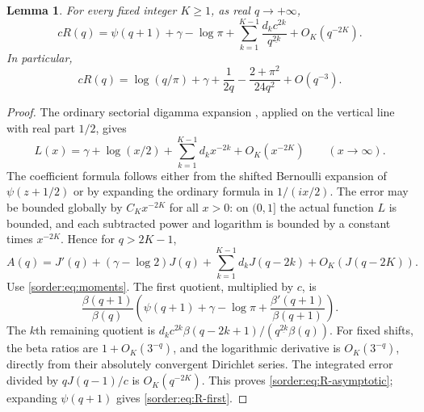 \documentclass[11pt,a4paper]{article}
\newtheorem{lemma}[theorem]{Lemma}
\theoremstyle{definition}
\theoremstyle{remark}
\numberwithin{equation}{section}
\begin{document}
\begin{lemma}\label{sorder:lem:R-asymptotic}
For every fixed integer $K\ge1$, as real $q\to+\infty$,
\begin{equation}\label{sorder:eq:R-asymptotic}
 cR(q)=\psi(q+1)+\gamma-\log\pi
       +\sum_{k=1}^{K-1}\frac{d_kc^{2k}}{q^{\underline{2k}}}
       +O_K(q^{-2K}).
\end{equation}
In particular,
\begin{equation}\label{sorder:eq:R-first}
 cR(q)=\log(q/\pi)+\gamma+\frac1{2q}
                  -\frac{2+\pi^2}{24q^2}+O(q^{-3}).
\end{equation}
\end{lemma}
\begin{proof}
The ordinary sectorial digamma expansion \cite[\S5.11]{DLMF}, applied on the vertical
line with real part $1/2$, gives
\[
 L(x)=\gamma+\log(x/2)+\sum_{k=1}^{K-1}d_kx^{-2k}
                     +O_K(x^{-2K})\qquad(x\to\infty).
\]
The coefficient formula follows either from the shifted Bernoulli
expansion of $\psi(z+1/2)$ or by expanding the ordinary formula in
$1/(ix/2)$. The error may be bounded globally by $C_Kx^{-2K}$ for
all $x>0$: on $(0,1]$ the actual function $L$ is bounded, and each
subtracted power and logarithm is bounded by a constant times
$x^{-2K}$. Hence for $q>2K-1$,
\[
 A(q)=J'(q)+(\gamma-\log2)J(q)
       +\sum_{k=1}^{K-1}d_kJ(q-2k)+O_K(J(q-2K)).
\]
Use \eqref{sorder:eq:moments}. The first quotient, multiplied by $c$,
is
\[
 \frac{\beta(q+1)}{\beta(q)}
 \left(\psi(q+1)+\gamma-\log\pi+
                         \frac{\beta'(q+1)}{\beta(q+1)}\right).
\]
The $k$th remaining quotient is
$d_kc^{2k}\beta(q-2k+1)/(q^{\underline{2k}}\beta(q))$.
For fixed shifts, the beta ratios are $1+O_K(3^{-q})$, and the
logarithmic derivative is $O_K(3^{-q})$, directly from their
absolutely convergent Dirichlet series. The integrated error divided
by $qJ(q-1)/c$ is $O_K(q^{-2K})$. This proves
\eqref{sorder:eq:R-asymptotic}; expanding $\psi(q+1)$ gives
\eqref{sorder:eq:R-first}.
\end{proof}
\end{document}
